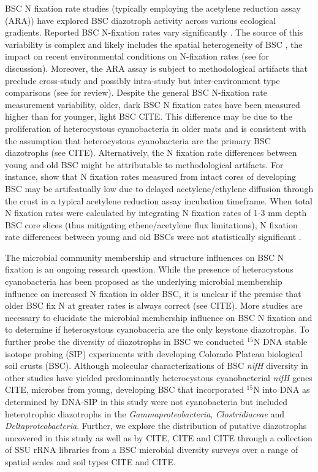 BSC N fixation rate studies (typically employing the acetylene reduction assay (ARA)) have explored BSC diazotroph activity across various ecological gradients. Reported BSC N-fixation rates vary significantly \cite{Evans_2001}. The source of this variability is complex and likely includes the spatial heterogeneity of BSC \cite{Evans_2001}, the impact on recent environmental conditions on N-fixation rates (see \citet{Belnap_2001} for discussion). Moreover, the ARA assay is subject to methodological artifacts that preclude cross-study and possibly intra-study but inter-environment type comparisons (see \citet{Belnap_2001} for review). Despite the general BSC N-fixation rate measurement variability, older, dark BSC N fixation rates have been measured higher than for younger, light BSC CITE. This difference may be due to the proliferation of heterocystous cyanobacteria in older mats and is consistent with the assumption that heterocystous cyanobacteria are the primary BSC diazotrophs (see CITE). Alternatively, the N fixation rate differences between young and old BSC might be attributable to methodological artifacts. For instance, \citet{15643930} show that N fixation rates measured from intact cores of developing BSC may be artifcatually low due to delayed acetylene/ethylene diffusion through the crust in a typical acetylene reduction assay incubation timeframe. When total N fixation rates were calculated by integrating N fixation rates of 1-3 mm depth BSC core slices (thus mitigating ethene/acetylene flux limitations), N fixation rate differences between young and old BSCs were not statistically significant \cite{15643930}.

The microbial community membership and structure influences on BSC N fixation is an ongoing research question. While the presence of heterocystous cyanobacteria has been proposed as the underlying microbial membership influence on increased N fixation in older BSC, it is unclear if the premise that older BSC fix N at greater rates is always correct (see CITE). More studies are necessary to elucidate the microbial membership influence on BSC N fixation and to determine if  heterosystous cyanobaceria are the only keystone diazotrophs. To further probe the diversity of diazotrophs in BSC we conducted $^{15}$N DNA stable isotope probing (SIP) experiments with developing Colorado Plateau biological soil crusts (BSC). Although molecular characterizations of BSC \textit{nifH} diversity in other studies have yielded predominantly heterocystous cyanobacterial \textit{nifH} genes CITE, microbes from young, developing BSC that incorporated $^{15}$N into DNA as determined by DNA-SIP in this study were not cyanobacteria but included heterotrophic diazotrophs in the \textit{Gammaproteobacteria}, \textit{Clostridiaceae} and \textit{Deltaproteobacteria}. Further, we explore the distribution of putative diazotrophs uncovered in this study as well as by CITE, CITE and CITE through a collection of SSU rRNA libraries from a BSC microbial diversity surveys over a range of spatial scales and soil types CITE and CITE.  